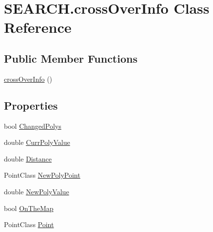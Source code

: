 \hypertarget{class_s_e_a_r_c_h_1_1cross_over_info}{\section{S\-E\-A\-R\-C\-H.\-cross\-Over\-Info Class Reference}
\label{class_s_e_a_r_c_h_1_1cross_over_info}
}
\subsection*{Public Member Functions}
\begin{DoxyCompactItemize}
\item 
\hyperlink{class_s_e_a_r_c_h_1_1cross_over_info_afa43185dee09a430129ba8ad43a9b855}{cross\-Over\-Info} ()
\end{DoxyCompactItemize}
\subsection*{Properties}
\begin{DoxyCompactItemize}
\item 
bool \hyperlink{class_s_e_a_r_c_h_1_1cross_over_info_a75324466c49acbc64bb59ee876713f4b}{Changed\-Polys}
\item 
double \hyperlink{class_s_e_a_r_c_h_1_1cross_over_info_af63c71e631a1f35983a06bb4c798ee05}{Curr\-Poly\-Value}
\item 
double \hyperlink{class_s_e_a_r_c_h_1_1cross_over_info_a3b72957ce0e0320b86ad7f7b6271be6f}{Distance}
\item 
Point\-Class \hyperlink{class_s_e_a_r_c_h_1_1cross_over_info_ab0bf18150222aa6504fbf6f50a3662ac}{New\-Poly\-Point}
\item 
double \hyperlink{class_s_e_a_r_c_h_1_1cross_over_info_a77fe824048d70a6d82bf0bdb0053c1fe}{New\-Poly\-Value}
\item 
bool \hyperlink{class_s_e_a_r_c_h_1_1cross_over_info_a53ccd25d7b5287a4b518c8a933284132}{On\-The\-Map}
\item 
Point\-Class \hyperlink{class_s_e_a_r_c_h_1_1cross_over_info_a671cc6d0068a750309e304d160208dd7}{Point}
\end{DoxyCompactItemize}


